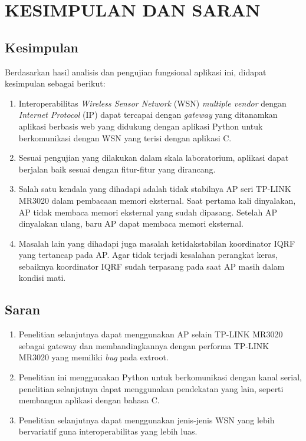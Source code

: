 
\chapter{KESIMPULAN DAN SARAN}

\section{Kesimpulan}
	Berdasarkan hasil analisis dan pengujian fungsional aplikasi ini, didapat kesimpulan sebagai berikut:

	\begin{enumerate}
		\item Interoperabilitas \emph{Wireless Sensor Network} (WSN) \emph{multiple vendor} dengan \emph{Internet Protocol} (IP) dapat tercapai dengan \emph{gateway} yang ditanamkan aplikasi berbasis web yang didukung dengan aplikasi Python untuk berkomunikasi dengan WSN yang terisi dengan aplikasi C.

		\item Sesuai pengujian yang dilakukan dalam skala laboratorium, aplikasi dapat berjalan baik sesuai dengan fitur-fitur yang dirancang.

		\item Salah satu kendala yang dihadapi adalah tidak stabilnya AP seri TP-LINK MR3020 dalam pembacaan memori eksternal. Saat pertama kali dinyalakan, AP tidak membaca memori eksternal yang sudah dipasang. Setelah AP dinyalakan ulang, baru AP dapat membaca memori eksternal.

		\item Masalah lain yang dihadapi juga masalah ketidakstabilan koordinator IQRF yang tertancap pada AP. Agar tidak terjadi kesalahan perangkat keras, sebaiknya koordinator IQRF sudah terpasang pada saat AP masih dalam kondisi mati.
	\end{enumerate}


\section{Saran}
	\begin{enumerate}
		\item Penelitian selanjutnya dapat menggunakan AP selain TP-LINK MR3020 sebagai gateway dan membandingkannya dengan performa TP-LINK MR3020 yang memiliki \emph{bug} pada extroot.
		\item Penelitian ini menggunakan Python untuk berkomunikasi dengan kanal serial, penelitian selanjutnya dapat menggunakan pendekatan yang lain, seperti membangun aplikasi dengan bahasa C.
		\item Penelitian selanjutnya dapat menggunakan jenis-jenis WSN yang lebih bervariatif guna interoperabilitas yang lebih luas.
	\end{enumerate}

	
\begin{comment}

\end{comment}
